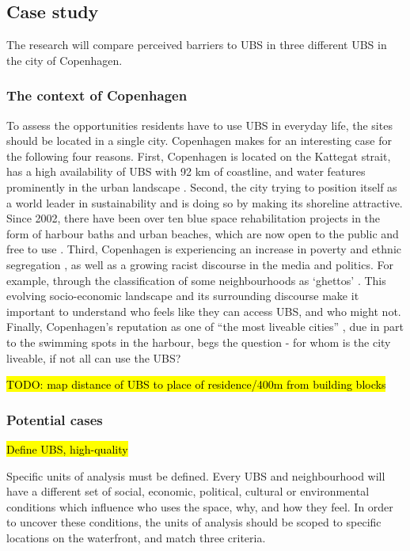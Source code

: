 \documentclass{article}
\begin{document}
\subsection{Case study}

The research will compare perceived barriers to UBS in three different UBS in the city of Copenhagen.

\subsubsection{The context of Copenhagen}

To assess the opportunities residents have to use UBS in everyday life, the sites should be located in a single city. Copenhagen makes for an interesting case for the following four reasons. First, Copenhagen is located on the Kattegat strait, has a high availability of UBS with 92 km of coastline, and water features prominently in the urban landscape \parencite{comertler2017greens}. Second, the city trying to position itself as a world leader in sustainability and is doing so by making its shoreline attractive. Since 2002, there have been over ten blue space rehabilitation projects in the form of harbour baths and urban beaches, which are now open to the public and free to use \parencite{visitcopenhagen_baths}. Third, Copenhagen is experiencing an increase in poverty and ethnic segregation \parencite{moller2015socioeconomic}, as well as a growing racist discourse in the media and politics. For example, through the classification of some neighbourhoods as ‘ghettos’ \parencite{simonsen2008practice}. This evolving socio-economic landscape and its surrounding discourse make it important to understand who feels like they can access UBS, and who might not. Finally, Copenhagen’s reputation as one of ``the most liveable cities'' \parencite{visitdenmark_2021}, due in part to the swimming spots in the harbour, begs the question - for whom is the city liveable, if not all can use the UBS?

\hl{TODO: map distance of UBS to place of residence/400m from building blocks}

\subsubsection{Potential cases}

\hl{Define UBS, high-quality}

Specific units of analysis must be defined. Every UBS and neighbourhood will have a different set of social, economic, political, cultural or environmental conditions which influence who uses the space, why, and how they feel. In order to uncover these conditions, the units of analysis should be scoped to specific locations on the waterfront, and match three criteria. 
\end{document}
